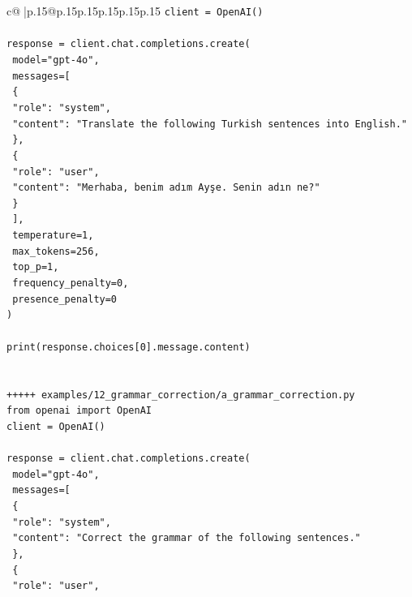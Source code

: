 \documentclass{article}
\begin{document}
{\begin{supertabular}{c@{$\;$}|p{.15\linewidth}@{}p{.15\linewidth}p{.15\linewidth}p{.15\linewidth}p{.15\linewidth}p{.15\linewidth}}
{{{\texttt{client = OpenAI()} \\
\\ 
\texttt{response = client.chat.completions.create(} \\
\texttt{  model="gpt{-}4o",} \\
\texttt{  messages={[}} \\
\texttt{    \{} \\
\texttt{      "role": "system",} \\
\texttt{      "content": "Translate the following Turkish sentences into English."} \\
\texttt{    \},} \\
\texttt{    \{} \\
\texttt{      "role": "user",} \\
\texttt{      "content": "Merhaba, benim adım Ayşe. Senin adın ne?"} \\
\texttt{    \}} \\
\texttt{  {]},} \\
\texttt{  temperature=1,} \\
\texttt{  max\_tokens=256,} \\
\texttt{  top\_p=1,} \\
\texttt{  frequency\_penalty=0,} \\
\texttt{  presence\_penalty=0} \\
\texttt{)} \\
\\ 
\texttt{print(response.choices{[}0{]}.message.content)} \\
\\ 
\\ 
\texttt{+++++ examples/12\_grammar\_correction/a\_grammar\_correction.py} \\
\texttt{from openai import OpenAI} \\
\texttt{client = OpenAI()} \\
\\ 
\texttt{response = client.chat.completions.create(} \\
\texttt{  model="gpt{-}4o",} \\
\texttt{  messages={[}} \\
\texttt{    \{} \\
\texttt{      "role": "system",} \\
\texttt{      "content": "Correct the grammar of the following sentences."} \\
\texttt{    \},} \\
\texttt{    \{} \\
\texttt{      "role": "user",} \\
}}}
\end{supertabular}}
\end{document}
